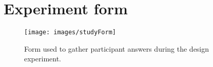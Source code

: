\section{Experiment form}
\label{app:studyForm}

\begin{figure}[htb]
  \centering
    \texttt{[image: images/studyForm]}
  \caption{Form used to gather participant answers during the design experiment.}
  \label{studyScreenshot}
\end{figure}
